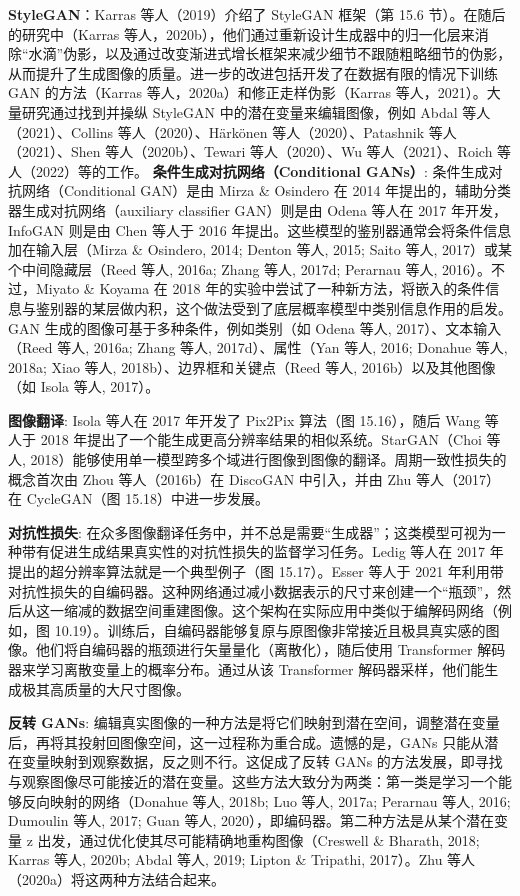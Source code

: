 \documentclass[lang=cn,newtx,10pt,scheme=chinese]{elegantbook}
\begin{document}
\textbf{StyleGAN}：Karras 等人（2019）介绍了 StyleGAN 框架（第 15.6 节）。在随后的研究中（Karras 等人，2020b），他们通过重新设计生成器中的归一化层来消除“水滴”伪影，以及通过改变渐进式增长框架来减少细节不跟随粗略细节的伪影，从而提升了生成图像的质量。进一步的改进包括开发了在数据有限的情况下训练 GAN 的方法（Karras 等人，2020a）和修正走样伪影（Karras 等人，2021）。大量研究通过找到并操纵 StyleGAN 中的潜在变量来编辑图像，例如 Abdal 等人（2021）、Collins 等人（2020）、Härkönen 等人（2020）、Patashnik 等人（2021）、Shen 等人（2020b）、Tewari 等人（2020）、Wu 等人（2021）、Roich 等人（2022）等的工作。
\textbf{条件生成对抗网络（Conditional GANs）}: 条件生成对抗网络（Conditional GAN）是由 Mirza \& Osindero 在 2014 年提出的，辅助分类器生成对抗网络（auxiliary classifier GAN）则是由 Odena 等人在 2017 年开发，InfoGAN 则是由 Chen 等人于 2016 年提出。这些模型的鉴别器通常会将条件信息加在输入层（Mirza \& Osindero, 2014; Denton 等人, 2015; Saito 等人, 2017）或某个中间隐藏层（Reed 等人, 2016a; Zhang 等人, 2017d; Perarnau 等人, 2016）。不过，Miyato \& Koyama 在 2018 年的实验中尝试了一种新方法，将嵌入的条件信息与鉴别器的某层做内积，这个做法受到了底层概率模型中类别信息作用的启发。GAN 生成的图像可基于多种条件，例如类别（如 Odena 等人, 2017）、文本输入（Reed 等人, 2016a; Zhang 等人, 2017d）、属性（Yan 等人, 2016; Donahue 等人, 2018a; Xiao 等人, 2018b）、边界框和关键点（Reed 等人, 2016b）以及其他图像（如 Isola 等人, 2017）。

\textbf{图像翻译}: Isola 等人在 2017 年开发了 Pix2Pix 算法（图 15.16），随后 Wang 等人于 2018 年提出了一个能生成更高分辨率结果的相似系统。StarGAN（Choi 等人, 2018）能够使用单一模型跨多个域进行图像到图像的翻译。周期一致性损失的概念首次由 Zhou 等人（2016b）在 DiscoGAN 中引入，并由 Zhu 等人（2017）在 CycleGAN（图 15.18）中进一步发展。

\textbf{对抗性损失}: 在众多图像翻译任务中，并不总是需要“生成器”；这类模型可视为一种带有促进生成结果真实性的对抗性损失的监督学习任务。Ledig 等人在 2017 年提出的超分辨率算法就是一个典型例子（图 15.17）。Esser 等人于 2021 年利用带对抗性损失的自编码器。这种网络通过减小数据表示的尺寸来创建一个“瓶颈”，然后从这一缩减的数据空间重建图像。这个架构在实际应用中类似于编解码网络（例如，图 10.19）。训练后，自编码器能够复原与原图像非常接近且极具真实感的图像。他们将自编码器的瓶颈进行矢量量化（离散化），随后使用 Transformer 解码器来学习离散变量上的概率分布。通过从该 Transformer 解码器采样，他们能生成极其高质量的大尺寸图像。

\textbf{反转 GANs}: 编辑真实图像的一种方法是将它们映射到潜在空间，调整潜在变量后，再将其投射回图像空间，这一过程称为重合成。遗憾的是，GANs 只能从潜在变量映射到观察数据，反之则不行。这促成了反转 GANs 的方法发展，即寻找与观察图像尽可能接近的潜在变量。这些方法大致分为两类：第一类是学习一个能够反向映射的网络（Donahue 等人, 2018b; Luo 等人, 2017a; Perarnau 等人, 2016; Dumoulin 等人, 2017; Guan 等人, 2020），即编码器。第二种方法是从某个潜在变量 z 出发，通过优化使其尽可能精确地重构图像（Creswell \& Bharath, 2018; Karras 等人, 2020b; Abdal 等人, 2019; Lipton \& Tripathi, 2017）。Zhu 等人（2020a）将这两种方法结合起来。
\end{document}
